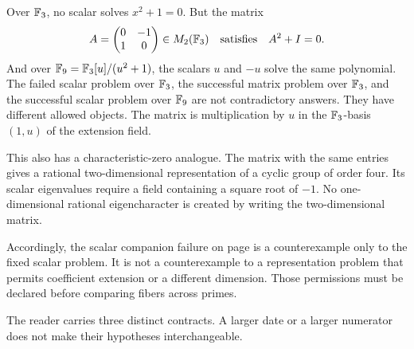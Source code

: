 Over $\mathbb F_3$, no scalar solves $x^2+1=0$. But the matrix
\[
A=\begin{pmatrix}0&-1\\1&0\end{pmatrix}\in M_2(\mathbb F_3)
\quad\text{satisfies}\quad A^2+I=0.
\]
And over $\mathbb F_9=\mathbb F_3[u]/(u^2+1)$, the scalars $u$ and $-u$ solve the same polynomial.
The failed scalar problem over $\mathbb F_3$, the successful matrix problem over $\mathbb F_3$, and the successful scalar problem over $\mathbb F_9$ are not contradictory answers. They have different allowed objects. The matrix is multiplication by $u$ in the $\mathbb F_3$-basis $(1,u)$ of the extension field.

This also has a characteristic-zero analogue. The matrix with the same entries gives a rational two-dimensional representation of a cyclic group of order four. Its scalar eigenvalues require a field containing a square root of $-1$. No one-dimensional rational eigencharacter is created by writing the two-dimensional matrix.

Accordingly, the scalar companion failure on page  is a counterexample only to the fixed scalar problem. It is not a counterexample to a representation problem that permits coefficient extension or a different dimension. Those permissions must be declared before comparing fibers across primes.

The reader carries three distinct contracts. A larger date or a larger numerator
does not make their hypotheses interchangeable.

